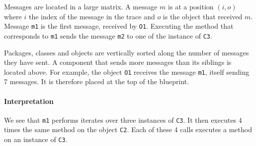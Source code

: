 \documentclass[10pt, conference, compsocconf]{IEEEtran}
\newcommand{\ct}{\lstinline[backgroundcolor=\color{white},basicstyle=\footnotesize\ttfamily]}
\newcommand{\figref}[1]{Figure~\ref{fig:#1}}
\begin{document}
Messages are located in a large matrix. A message $m$ is at a position $(i,o)$ where $i$ the index of the message in the trace and $o$ is the object that received $m$. Message \ct{m1} is the first message, received by \ct{O1}. Executing the method that corresponds to \ct{m1} sends the message \ct{m2} to one of the instance of \ct{C3}. 

Packages, classes and objects are vertically sorted along the number of messages they have sent. A component that sends more messages than its siblings is located above. For example, the object \ct{O1} receives the message \ct{m1}, itself sending 7 messages. It is therefore placed at the top of the blueprint. 

\paragraph{Interpretation}
We see that \ct{m1} performs iterates over three instances of \ct{C3}. It then executes 4 times the same method on the object \ct{C2}. Each of these 4 calls  executes a method on an instance of \ct{C3}.


%
%
%
%
\end{document}
